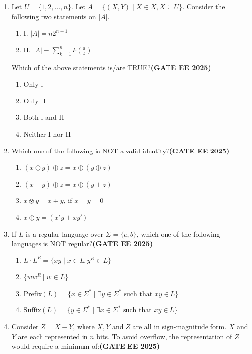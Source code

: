 \documentclass[journal,12pt,onecolumn]{IEEEtran}
\theoremstyle{remark}
\begin{document}
\begin{enumerate}
\item Let $U = \{1,2,\ldots,n\}$. Let $A = \{(X,Y) \mid X \in X, X \subseteq U\}$. Consider the following two statements on $|A|$.   
\begin{enumerate}
\item I. $|A| = n2^{n-1}$
\item II. $|A| = \sum_{k=1}^n k\binom{n}{k}$
\end{enumerate}
Which of the above statements is/are TRUE?\hfill \textbf{(GATE EE 2025)}

\begin{enumerate} 
\item Only I
\item Only II
\item Both I and II
\item Neither I nor II
\end{enumerate}

\item Which one of the following is NOT a valid identity?\hfill \textbf{(GATE EE 2025)}

\begin{enumerate} 
\item $(x \oplus y) \oplus z = x \oplus (y \oplus z)$
\item $(x + y) \oplus z = x \oplus (y + z)$
\item $x \otimes y = x+y$, if $x=y=0$
\item $x \oplus y = (x'y + xy')$
\end{enumerate}

\item If $L$ is a regular language over $\Sigma = \{a,b\}$, which one of the following languages is NOT regular?\hfill \textbf{(GATE EE 2025)}

\begin{enumerate} 
\item $L \cdot L^R = \{xy \mid x \in L, y^R \in L\}$
\item $\{ww^R \mid w \in L\}$
\item $\text{Prefix}(L) = \{x \in \Sigma^* \mid \exists y \in \Sigma^* \text{ such that } xy \in L\}$
\item $\text{Suffix}(L) = \{y \in \Sigma^* \mid \exists x \in \Sigma^* \text{ such that } xy \in L\}$
\end{enumerate}

\item Consider $Z = X - Y$, where $X, Y$ and $Z$ are all in sign-magnitude form. $X$ and $Y$ are each represented in $n$ bits. To avoid overflow, the representation of $Z$ would require a minimum of:\hfill \textbf{(GATE EE 2025)}


\end{enumerate}
\end{document}
